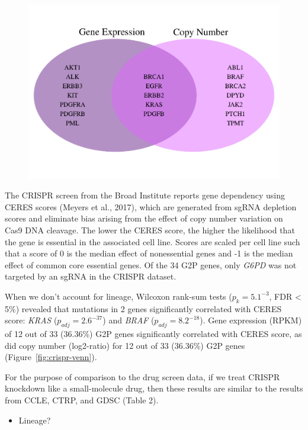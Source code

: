 \documentclass[man,floatsintext]{apa6}
\providecommand{\tightlist}{%
  \setlength{\itemsep}{0pt}\setlength{\parskip}{0pt}}
\begin{document}
\begin{figure}
\centering
\includegraphics{manuscript_files/figure-latex/crispr-venn-1.pdf}
\caption{}
\end{figure}

The CRISPR screen from the Broad Institute reports gene dependency using
CERES scores (Meyers et al., 2017), which are generated from sgRNA
depletion scores and eliminate bias arising from the effect of copy
number variation on Cas9 DNA cleavage. The lower the CERES score, the
higher the likelihood that the gene is essential in the associated cell
line. Scores are scaled per cell line such that a score of 0 is the
median effect of nonessential genes and -1 is the median effect of
common core essential genes. Of the 34 G2P genes, only \emph{G6PD} was
not targeted by an sgRNA in the CRISPR dataset.

When we don't account for lineage, Wilcoxon rank-sum tests
(\(p_k = 5.1^{-3}\), FDR \textless{} 5\%) revealed that mutations in 2
genes significantly correlated with CERES score: \emph{KRAS}
(\(p_{adj} = 2.6^{-37}\)) and \emph{BRAF} (\(p_{adj} = 8.2^{-18}\)).
Gene expression (RPKM) of 12 out of 33 (36.36\%) G2P genes significantly
correlated with CERES score, as did copy number (log2-ratio) for 12 out
of 33 (36.36\%) G2P genes (Figure~\ref{fig:crispr-venn}).

For the purpose of comparison to the drug screen data, if we treat
CRISPR knockdown like a small-molecule drug, then these results are
similar to the results from CCLE, CTRP, and GDSC (Table 2).

\begin{itemize}
\tightlist
\item
  Lineage?
\end{itemize}
\end{document}
